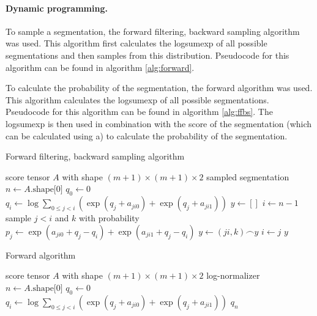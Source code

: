\paragraph{Dynamic programming.}
To sample a segmentation, the forward filtering, backward sampling algorithm  was used.
This algorithm first calculates the logsumexp of all possible segmentations and then samples from this distribution.
Pseudocode for this algorithm can be found in algorithm \ref{alg:forward}.

To calculate the probability of the segmentation, the forward algorithm was used.
This algorithm calculates the logsumexp of all possible segmentations.
Pseudocode for this algorithm can be found in algorithm \ref{alg:ffbs}.
The logsumexp is then used in combination with the score of the segmentation (which can be calculated using a) to calculate the probability of the segmentation.

\begin{algorithm}
\caption{Forward filtering, backward sampling algorithm}
\label{alg:ffbs}
\begin{algorithmic}
\Require score tensor $A$ with shape $(m+1) \times (m+1) \times 2$
\Ensure sampled segmentation
\State
\State $n \gets A.\text{shape[0]}$
\State $q_0 \gets 0$
    \State $q_i \gets \log \sum_{0 \leq j < i} (\exp (q_j + a_{ji0}) + \exp (q_j + a_{ji1}))$
\EndFor
\State
\State $y \gets []$
\State $i \gets n - 1$
    \State sample $j < i$ and $k$ with probability $p_j \gets \exp (a_{ji0} + q_j - q_i) + \exp(a_{ji1} + q_j - q_i)$
    \State $y \gets (ji,k) \frown y$
    \State $i \gets j$
\EndWhile
\State
\State \Return $y$
\end{algorithmic}
\end{algorithm}

\begin{algorithm}
\caption{Forward algorithm}
\label{alg:forward}
\begin{algorithmic}
\Require score tensor $A$ with shape $(m+1) \times (m+1) \times 2$
\Ensure log-normalizer
\State
\State $n \gets A.\text{shape[0]}$
\State $q_0 \gets 0$
    \State $q_i \gets \log \sum_{0 \leq j < i} (\exp (q_j + a_{ji0}) + \exp (q_j + a_{ji1}))$
\EndFor
\State
\State \Return $q_n$
\end{algorithmic}
\end{algorithm}

